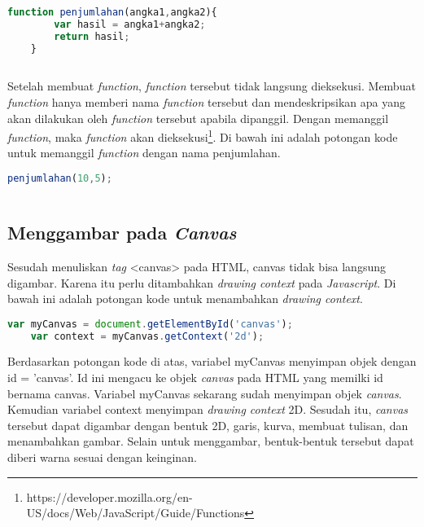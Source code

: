 \begin{lstlisting}[language=Javascript, caption=\textit{Function} penjumlahan 2 buah bilangan]
	function penjumlahan(angka1,angka2){
		var hasil = angka1+angka2;
		return hasil;
	}
	
\end{lstlisting}

Setelah membuat \textit{function}, \textit{function} tersebut tidak langsung dieksekusi. Membuat \textit{function} hanya memberi nama \textit{function} tersebut dan mendeskripsikan apa yang akan dilakukan oleh \textit{function} tersebut apabila dipanggil. Dengan memanggil \textit{function}, maka \textit{function} akan dieksekusi\footnote{https://developer.mozilla.org/en-US/docs/Web/JavaScript/Guide/Functions}. Di bawah ini adalah potongan kode untuk memanggil \textit{function} dengan nama penjumlahan.

\begin{lstlisting}[language=Javascript, caption=Memanggil \textit{function} penjumlahan]
	penjumlahan(10,5);
	
\end{lstlisting}

\subsection{Menggambar pada \textit{Canvas}}
Sesudah menuliskan \textit{tag} <canvas> pada HTML, canvas tidak bisa langsung digambar. Karena itu perlu ditambahkan \textit{drawing context} pada \textit{Javascript}. Di bawah ini adalah potongan kode untuk menambahkan \textit{drawing context}.

\begin{lstlisting}[language=Javascript, caption=Menambahkan \textit{drawing context canvas}]
	var myCanvas = document.getElementById('canvas');
	var context = myCanvas.getContext('2d');
\end{lstlisting}

Berdasarkan potongan kode di atas, variabel myCanvas menyimpan objek dengan id = 'canvas'. Id ini mengacu ke objek \textit{canvas} pada HTML yang memilki id bernama canvas. Variabel myCanvas sekarang sudah menyimpan objek \textit{canvas}. Kemudian variabel context menyimpan \textit{drawing context} 2D. Sesudah itu, \textit{canvas} tersebut dapat digambar dengan bentuk 2D, garis, kurva, membuat tulisan, dan menambahkan gambar. Selain untuk menggambar, bentuk-bentuk tersebut dapat diberi warna sesuai dengan keinginan.\\

